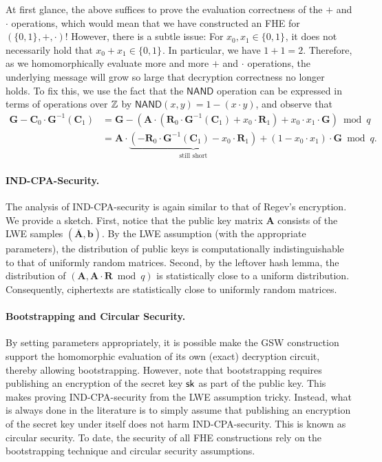 \documentclass[10pt,twoside]{article}
\newcommand{\bits}[1][]{\{0,1\}^{#1}}
\renewcommand{\vec}[1]{\mathbf{#1}}
\newcommand{\mat}[1]{\mathbf{#1}}
\renewcommand{\NAND}{\mathsf{NAND}}
\begin{document}
At first glance, the above suffices to prove the evaluation correctness of the $+$ and $\cdot$ operations, which would mean that we have constructed an FHE for $(\bits,+,\cdot)$! 
However, there is a subtle issue: For $x_0, x_1 \in \bits$, it does not necessarily hold that $x_0 + x_1 \in \bits$. 
In particular, we have $1 + 1 = 2$.
Therefore, as we homomorphically evaluate more and more $+$ and $\cdot$ operations, the underlying message will grow so large that decryption correctness no longer holds.
To fix this, we use the fact that the $\NAND$ operation can be expressed in terms of operations over $\mathbb{Z}$ by $\NAND(x,y) = 1 - (x \cdot y)$, and observe that
\begin{align*}
    \mat{G} - \mat{C}_0 \cdot \mat{G}^{-1}(\mat{C}_1)
    &= \mat{G} - (\mat{A} \cdot (\mat{R}_0 \cdot \mat{G}^{-1}(\mat{C}_1) + x_0 \cdot \mat{R}_1) + x_0 \cdot x_1 \cdot \mat{G}) \bmod q \\
    &= \mat{A} \cdot \underbrace{(-\mat{R}_0 \cdot \mat{G}^{-1}(\mat{C}_1) - x_0 \cdot \mat{R}_1)}_{\text{still short}} + (1 - x_0 \cdot x_1) \cdot \mat{G} \bmod q.
\end{align*}


\paragraph{IND-CPA-Security.}

The analysis of IND-CPA-security is again similar to that of Regev's encryption.
We provide a sketch.
First, notice that the public key matrix $\mat{A}$ consists of the LWE samples $(\overline{\mat{A}}, \vec{b})$.
By the LWE assumption (with the appropriate parameters), the distribution of public keys is computationally indistinguishable to that of uniformly random matrices.
Second, by the leftover hash lemma, the distribution of $(\mat{A}, \mat{A} \cdot \mat{R} \bmod q)$ is statistically close to a uniform distribution.
Consequently, ciphertexts are statistically close to uniformly random matrices.

\paragraph{Bootstrapping and Circular Security.}

By setting parameters appropriately, it is possible make the GSW construction support the homomorphic evaluation of its own (exact) decryption circuit, thereby allowing bootstrapping.
However, note that bootstrapping requires publishing an encryption of the secret key $\sk$ as part of the public key.
This makes proving IND-CPA-security from the LWE assumption tricky.
Instead, what is always done in the literature is to simply assume that publishing an encryption of the secret key under itself does not harm IND-CPA-security.
This is known as circular security.
To date, the security of all FHE constructions rely on the bootstrapping technique and circular security assumptions.

\printbibliography
\end{document}
